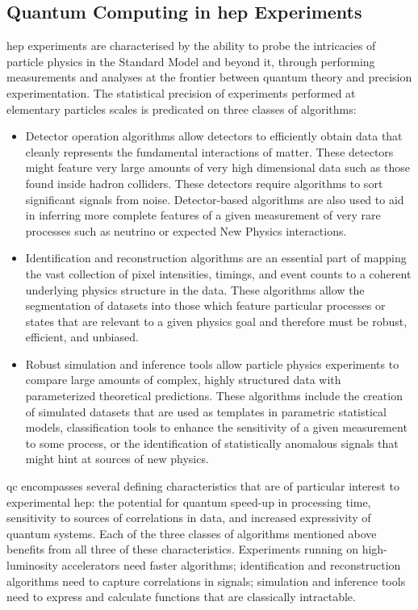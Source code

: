 \subsection{Quantum Computing in \gls{hep} Experiments}
\gls{hep} experiments are characterised by the ability to probe the intricacies of particle physics in the Standard Model and beyond it, through performing measurements and analyses at the frontier between quantum theory and precision experimentation.
The statistical precision of experiments performed at elementary particles   scales is predicated on three classes of algorithms:
\begin{itemize}
    \item Detector operation algorithms allow detectors to efficiently obtain data that cleanly represents the fundamental interactions of matter. These detectors might feature very large amounts of very high dimensional data such as those found inside hadron colliders. These detectors require algorithms to sort significant signals from noise. Detector-based algorithms are also used to aid in inferring more complete features of a given measurement of very rare processes such as neutrino or expected New Physics interactions.
    \item Identification and reconstruction algorithms are an essential part of mapping the vast collection of pixel intensities, timings, and event counts to a coherent underlying physics structure in the data. These algorithms allow the segmentation of datasets into those which feature particular processes or states that are relevant to a given physics goal and therefore must be robust, efficient, and unbiased.
    \item Robust simulation and inference tools allow 
    particle physics experiments to compare large amounts of complex, highly structured data with parameterized theoretical predictions. These algorithms include the creation of simulated datasets that are used as templates in parametric statistical models, classification tools to enhance the sensitivity of a given measurement to some process, or the identification of statistically anomalous signals that might hint at sources of new physics. 
\end{itemize}
\gls{qc} 
encompasses
several defining characteristics that are of particular interest to experimental \gls{hep}: the potential for quantum speed-up in processing time, sensitivity to sources of correlations in data, and increased expressivity of quantum systems. 
Each of the three classes of algorithms mentioned above benefits from all three of these characteristics. Experiments running on high-luminosity accelerators need faster algorithms; identification and reconstruction algorithms need to capture correlations in signals; simulation and inference tools need to express and calculate functions that are classically intractable.

